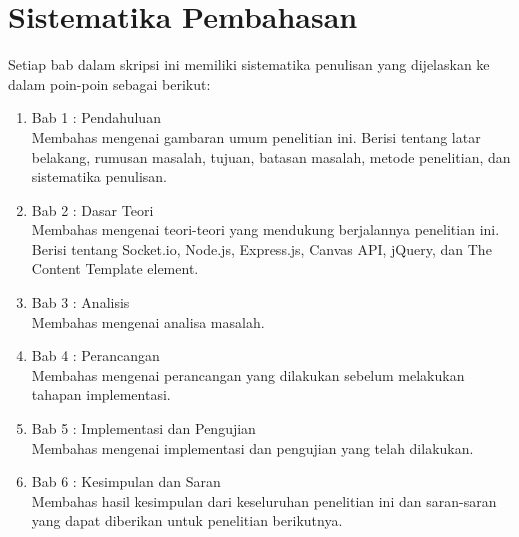 \section{Sistematika Pembahasan}
\label{sec:sispem}
Setiap bab dalam skripsi ini memiliki sistematika penulisan yang dijelaskan ke dalam poin-poin sebagai berikut:

\begin{enumerate}
	\item Bab 1 : Pendahuluan \\
	Membahas mengenai gambaran umum penelitian ini. Berisi tentang latar belakang, rumusan masalah, tujuan, batasan masalah, metode penelitian, dan sistematika penulisan.
	
	\item Bab 2 : Dasar Teori \\
	Membahas mengenai teori-teori yang mendukung berjalannya penelitian ini. Berisi tentang Socket.io, Node.js, Express.js, Canvas API, jQuery, dan The Content Template element.
	
	\item Bab 3 : Analisis \\
	Membahas mengenai analisa masalah.
	
	\item Bab 4 : Perancangan \\
	Membahas mengenai perancangan yang dilakukan sebelum melakukan tahapan implementasi.
	
	\item Bab 5 : Implementasi dan Pengujian \\
	Membahas mengenai implementasi dan pengujian yang telah dilakukan.
	
	\item Bab 6 : Kesimpulan dan Saran \\
	Membahas hasil kesimpulan dari keseluruhan penelitian ini dan saran-saran yang dapat diberikan untuk penelitian berikutnya.
\end{enumerate}